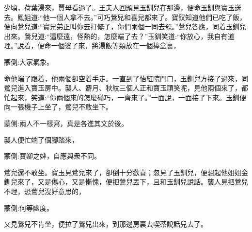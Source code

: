 \begin{parag}
    少頃，荷葉湯來，賈母看過了。王夫人回頭見玉釧兒在那邊，便命玉釧與寶玉送去。鳳姐道:“他一個人拿不去。”可巧鶯兒和喜兒都來了。寶釵知道他們已吃了飯，便向鶯兒道:“寶兄弟正叫你去打絛子，你們兩個一同去罷。”鶯兒答應，同着玉釧兒出來。鶯兒道:“這麼遠，怪熱的，怎麼端了去？”玉釧笑道:“你放心，我自有道理。”說着，便命一個婆子來，將湯飯等類放在一個捧盒裏，\begin{note}蒙側:大家氣象。\end{note}命他端了跟着，他兩個卻空着手走。一直到了怡紅院門口，玉釧兒方接了過來，同鶯兒進入寶玉房中。襲人、麝月、秋紋三個人正和寶玉頑笑呢，見他兩個來了，都忙起來，笑道:“你兩個來的怎麼碰巧，一齊來了。”一面說，一面接了下來。玉釧便向一張機子上坐了，鶯兒不敢坐下。\begin{note}蒙側:兩人不一樣寫，真是各進其文於後。\end{note}襲人便忙端了個腳踏來，\begin{note}蒙側:寶卿之婢，自應與衆不同。\end{note}鶯兒還不敢坐。寶玉見鶯兒來了，卻倒十分歡喜；忽見了玉釧兒，便想起他姐姐金釧兒來了，又是傷心，又是慚愧，便把鶯兒丟下，且和玉釧兒說話。襲人見把鶯兒不理，恐鶯兒沒好意思的，\begin{note}蒙側:何等幽度。\end{note}又見鶯兒不肯坐，便拉了鶯兒出來，到那邊房裏去喫茶說話兒去了。
\end{parag}


